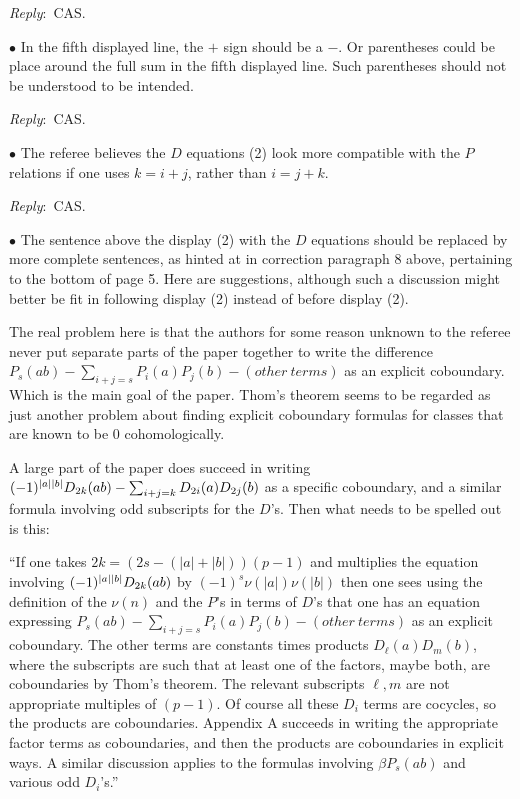 \documentclass{amsart}
\newcommand{\ar}{\medskip\noindent\textit{Reply}:\ }
\def\subitem{\medskip\noindent$\bullet$ }
\begin{document}
\begin{enumerate}
	\ar CAS.

	\subitem In the fifth displayed line, the $+$ sign should be a $-$.
	Or parentheses could be place around the full sum in the fifth displayed line.
	Such parentheses should not be understood to be	intended.

	\ar CAS.

	\subitem The referee believes the $D$ equations (2) look more compatible with the $P$ relations if one uses $k = i+j$, rather than $i = j+k$.

	\ar CAS.

	\subitem The sentence above the display (2) with the $D$ equations should be replaced by more complete sentences, as hinted at in correction paragraph 8 above, pertaining to the bottom of page 5.
	Here are suggestions, although such a discussion might better be fit in following display (2) instead of before display (2).

	\medskip\noindent The real problem here is that the authors for some reason unknown to the referee never put separate parts of the paper together to write the difference $P_s(ab) - \sum_{i+j=s} P_i(a)P_j(b) - (other\ terms)$ as an explicit coboundary.
	Which is the main goal of the paper.
	Thom’s theorem seems to	be regarded as just another problem about finding explicit coboundary formulas for classes that are known to be 0 cohomologically.

	\medskip\noindent A large part of the paper does succeed in writing $(-1)^{\lvert a\rvert\lvert b\rvert} D_{2k}(ab) - \sum_{i+j=k} D_{2i}(a) D_{2j}(b)$
	as a specific coboundary, and a similar formula involving odd subscripts for the $D$’s.
	Then what needs to be spelled out is this:

	\medskip\noindent ``If one takes $2k = (2s-(|a|+|b|))(p-1)$ and multiplies the equation involving $(-1)^{\lvert a\rvert\lvert b\rvert} D_{2k}(ab)$ by $(-1)^s \nu(|a|)\nu(|b|)$ then one sees using the definition of the $\nu(n)$ and the $P$’s in terms of $D$’s that one has an equation expressing $P_s(ab) - \sum_{i+j=s} P_i(a)P_j(b) - (other\ terms)$ as an explicit coboundary.
	The other terms are constants times products $D_\ell(a) D_m(b)$, where the subscripts are such that at least one of the factors, maybe both, are coboundaries by Thom’s theorem.
	The relevant subscripts $\ell, m$ are not appropriate multiples of $(p-1)$.
	Of course all these $D_i$ terms are cocycles, so the products are coboundaries.
	Appendix A succeeds in writing the appropriate factor terms as coboundaries, and then the products are coboundaries in explicit ways.
	A similar discussion applies to the formulas involving $\beta P_s(ab)$ and various odd $D_i$’s.”


\end{enumerate}
\end{document}
